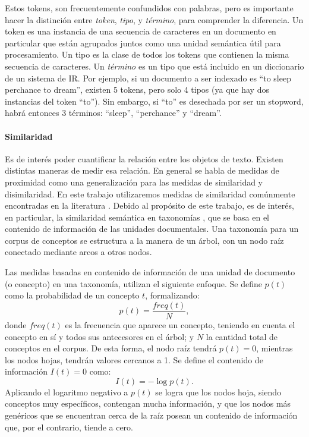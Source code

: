 Estos tokens, son frecuentemente confundidos con palabras, pero es importante hacer la distinción entre \textit{token}, \textit{tipo}, y \textit{término}, para comprender la diferencia. Un token es una instancia de una secuencia de caracteres en un documento en particular que están agrupados juntos como una unidad semántica útil para procesamiento. Un tipo es la clase de todos los tokens que contienen la misma secuencia de caracteres. Un \textit{término} es un tipo que está incluido en un diccionario de un sistema de IR. Por ejemplo, si un documento a ser indexado es “to sleep perchance to dream”, existen 5 tokens, pero solo 4 tipos (ya que hay dos instancias del token “to”). Sin embargo, si “to” es desechada por ser un stopword, habrá entonces 3 términos: “sleep”, “perchance” y “dream”.

\paragraph{Similaridad}\label{paragraph:similaridad}
Es de interés poder cuantificar la relación entre los objetos de texto. Existen distintas maneras de medir esa relación. En general se habla de medidas de proximidad como una generalización para las medidas de similaridad y disimilaridad. En este trabajo utilizaremos medidas de similaridad comúnmente encontradas en la literatura \citep{resnik1995using, lin1998information, gomaa2013survey, harispe2015semantic}. Debido al propósito de este trabajo, es de interés, en particular, la similaridad semántica en taxonomías \citep{resnik1995using}, que se basa en el contenido de información de las unidades documentales. Una taxonomía para un corpus de conceptos se estructura a la manera de un árbol, con un nodo raíz conectado mediante arcos a otros nodos.

\bigskip Las medidas basadas en contenido de información de una unidad de documento (o concepto) en una taxonomía, utilizan el siguiente enfoque. Se define \(p(t)\) como la probabilidad de un concepto \(t\), formalizando:
\[p(t)=\frac{freq(t)}{N},\]
donde \(freq(t)\) es la frecuencia que aparece un concepto, teniendo en cuenta el concepto en sí y todos sus antecesores en el árbol; y \(N\) la cantidad total de conceptos en el corpus. De esta forma, el nodo raíz tendrá \(p(t) = 0\), mientras los nodos hojas, tendrán valores cercanos a 1. Se define el contenido de información \(I(t) = 0\) como:
\[I(t)=-\log p(t).\]
Aplicando el logaritmo negativo a \(p(t)\) se logra que los nodos hoja, siendo conceptos muy específicos, contengan mucha información, y que los nodos más genéricos que se encuentran cerca de la raíz posean un contenido de información que, por el contrario, tiende a cero.

